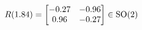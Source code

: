 \documentclass[preview]{standalone}
\begin{document}
\begin{align*}
\special{dvisvgm:raw <g id='unique000'>}R(1.84) = \begin{bmatrix} -0.27 & -0.96 \\ 0.96 & -0.27 \end{bmatrix} \in \text{SO}(2)\special{dvisvgm:raw </g>}
\end{align*}
\end{document}
